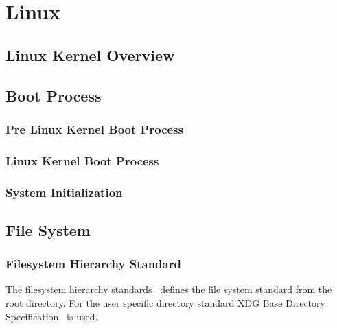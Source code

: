\chapter{Linux}


\section{Linux Kernel Overview}


\section{Boot Process}

\subsection{Pre Linux Kernel Boot Process}
\subsection{Linux Kernel Boot Process}
\subsection{System Initialization}


\section{File System}
\subsection{Filesystem Hierarchy Standard}
The filesystem hierarchy standards~\cite{fhs_3.0} defines the file system standard from the root directory. For the user specific directory standard XDG Base Directory Specification~\cite{xdg_basedir_spec} is used.


